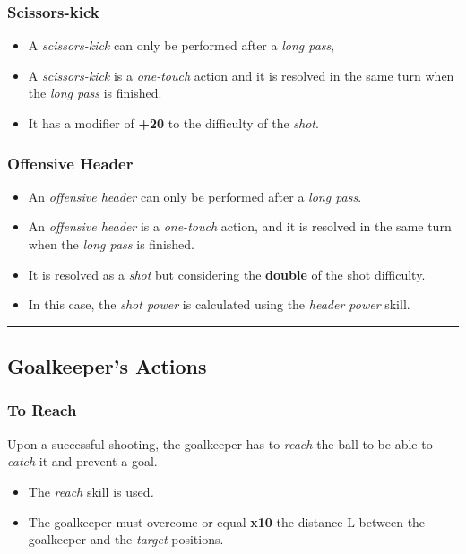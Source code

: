 \documentclass[12pt]{article}
\begin{document}
\subsubsection{Scissors-kick}
\begin{rulebox}
\begin{itemize}
\item A \emph{scissors-kick} can only be performed after a \emph{long pass},
\item A \emph{scissors-kick} is a \emph{one-touch} action and it is resolved in the same turn when the \emph{long pass }is finished.
\item It has a modifier of \textbf{+20} to the difficulty of the \emph{shot}.
\end{itemize}
\end{rulebox}

\subsubsection{Offensive Header}
\begin{rulebox}
\begin{itemize}
\item An \emph{offensive header} can only be performed after a \emph{long pass}.
\item An \emph{offensive header} is a \emph{one-touch} action, and it is resolved in the same turn when the \emph{long pass }is finished.
\item It is resolved as a \emph{shot }but considering the \textbf{double }of the shot difficulty.
\item In this case, the \emph{shot power} is calculated using the \emph{header power} skill.
\end{itemize}
\end{rulebox}

\bigskip\hrule\bigskip

\subsection{\textbf{Goalkeeper's Actions}}

\subsubsection{To Reach}
Upon a successful shooting, the goalkeeper has to \emph{reach }the ball to be able to \emph{catch }it and prevent a goal.

\begin{rulebox}
\begin{itemize}
\item The \emph{reach }skill is used\emph{.}
\item The goalkeeper must overcome or equal \textbf{x10 }the distance L between the goalkeeper and the \emph{target} positions.
\end{itemize}
\end{rulebox}
\end{document}

